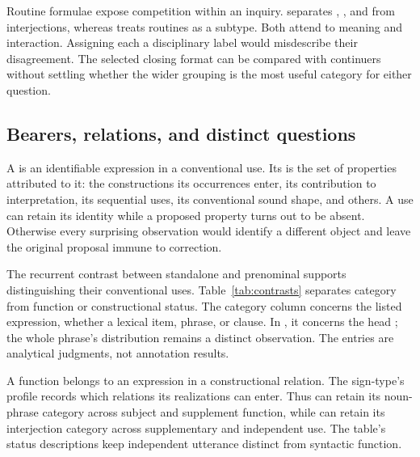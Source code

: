 \documentclass[12pt]{article}
\begin{document}
Routine formulae expose competition within an inquiry.
\textcite[108--110]{ameka1992} separates , ,
and  from interjections, whereas
\textcite[142]{wilkins1992} treats routines as a subtype. Both attend
to meaning and interaction. Assigning each a disciplinary label would
misdescribe their disagreement. The selected closing format can be
compared with continuers without settling whether the wider grouping
is the most useful category for either question.

\subsection{Bearers, relations, and distinct questions}

A  is an identifiable expression in a conventional use.
Its  is the set of properties attributed to it: the
constructions its occurrences enter, its contribution to interpretation,
its sequential uses, its conventional sound shape, and others. A use can retain its identity
while a proposed property turns out to be absent. Otherwise every
surprising observation would identify a different object and leave the
original proposal immune to correction.

The recurrent contrast between standalone and prenominal 
supports distinguishing their conventional uses. Table~\ref{tab:contrasts}
separates category from function or constructional status. The category
column concerns the listed expression, whether a lexical item, phrase,
or clause. In , it concerns the head ;
the whole phrase's distribution remains a distinct observation.
The entries are analytical judgments, not annotation results.

A function belongs to an expression in a constructional relation.
The sign-type's profile records which relations its realizations can
enter. Thus  can retain its noun-phrase category
across subject and supplement function, while  can retain
its interjection category across supplementary and independent use.
The table's status descriptions keep independent utterance distinct
from syntactic function.
\end{document}
